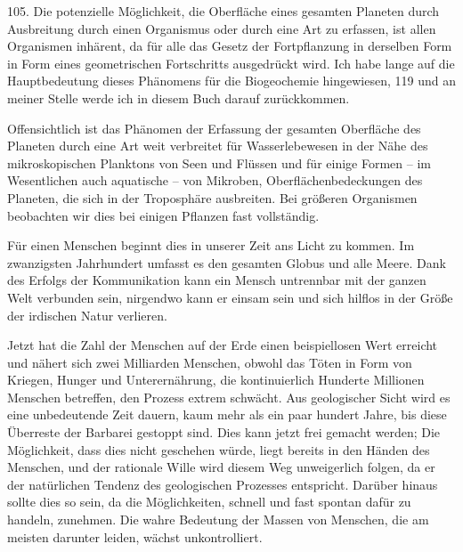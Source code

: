 \documentclass[11pt,a4paper]{book}
\begin{document}
105. Die potenzielle Möglichkeit, die Oberfläche eines gesamten Planeten durch Ausbreitung durch einen Organismus oder durch eine Art zu erfassen, ist allen Organismen inhärent, da für alle das Gesetz der Fortpflanzung in derselben Form in Form eines geometrischen Fortschritts ausgedrückt wird. Ich habe lange auf die Hauptbedeutung dieses Phänomens für die Biogeochemie hingewiesen, 119 und an meiner Stelle werde ich in diesem Buch darauf zurückkommen.



Offensichtlich ist das Phänomen der Erfassung der gesamten Oberfläche des Planeten durch eine Art weit verbreitet für Wasserlebewesen in der Nähe des mikroskopischen Planktons von Seen und Flüssen und für einige Formen -- im Wesentlichen auch aquatische -- von Mikroben, Oberflächenbedeckungen des Planeten, die sich in der Troposphäre ausbreiten. Bei größeren Organismen beobachten wir dies bei einigen Pflanzen fast vollständig.



Für einen Menschen beginnt dies in unserer Zeit ans Licht zu kommen. Im zwanzigsten Jahrhundert umfasst es den gesamten Globus und alle Meere. Dank des Erfolgs der Kommunikation kann ein Mensch untrennbar mit der ganzen Welt verbunden sein, nirgendwo kann er einsam sein und sich hilflos in der Größe der irdischen Natur verlieren.



Jetzt hat die Zahl der Menschen auf der Erde einen beispiellosen Wert erreicht und nähert sich zwei Milliarden Menschen, obwohl das Töten in Form von Kriegen, Hunger und Unterernährung, die kontinuierlich Hunderte Millionen Menschen betreffen, den Prozess extrem schwächt. Aus geologischer Sicht wird es eine unbedeutende Zeit dauern, kaum mehr als ein paar hundert Jahre, bis diese Überreste der Barbarei gestoppt sind. Dies kann jetzt frei gemacht werden; Die Möglichkeit, dass dies nicht geschehen würde, liegt bereits in den Händen des Menschen, und der rationale Wille wird diesem Weg unweigerlich folgen, da er der natürlichen Tendenz des geologischen Prozesses entspricht. Darüber hinaus sollte dies so sein, da die Möglichkeiten, schnell und fast spontan dafür zu handeln, zunehmen. Die wahre Bedeutung der Massen von Menschen, die am meisten darunter leiden, wächst unkontrolliert.
\end{document}
